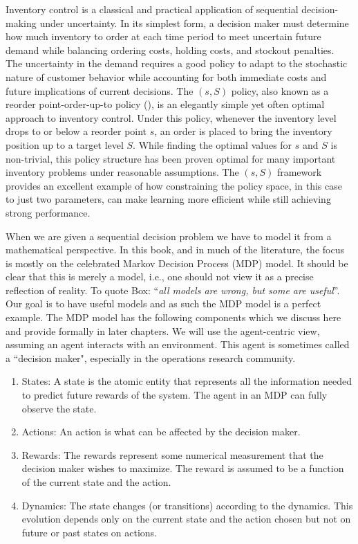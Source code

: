 \begin{example}
Inventory control is a classical and practical application of sequential decision-making under uncertainty. In its simplest form, a decision maker must determine how much inventory to order at each time period to meet uncertain future demand while balancing ordering costs, holding costs, and stockout penalties. The uncertainty in the demand requires a good policy to adapt to the stochastic nature of customer behavior while accounting for both immediate costs and future implications of current decisions.
The $(s,S)$ policy, also known as a reorder point-order-up-to policy (\cite{scarf1959optimality}), is an elegantly simple yet often optimal approach to inventory control. Under this policy, whenever the inventory level drops to or below a reorder point $s$, an order is placed to bring the inventory position up to a target level $S$. While finding the optimal values for $s$ and $S$ is non-trivial, this policy structure has been proven optimal for many important inventory problems under reasonable assumptions. The $(s,S)$ framework provides an excellent example of how constraining the policy space, in this case to just two parameters, can make learning more efficient while still achieving strong performance. \end{example}
When we are given a sequential decision problem we have to model it from a mathematical perspective. In this book, and in much of the literature, the focus is mostly on the celebrated Markov Decision Process (MDP) model. It should be clear that this is merely a model, i.e., one should not view it as a precise reflection of reality. To quote Box: ``{\it all models are wrong, but some are useful}''. Our goal is to have useful models and as such the MDP model is a perfect example. The MDP model has the following components which we discuss here and provide formally in later chapters. We will use the agent-centric view, assuming an agent interacts with an environment. This agent is sometimes called a ``decision maker", especially in the operations research community. 
\begin{enumerate}
    \item States: A state is the atomic entity that represents all the information needed to predict future rewards of the system. The agent in an MDP can fully observe the state.
    \item Actions: An action is what can be affected by the decision maker.
    \item Rewards: The rewards represent some numerical measurement that the decision maker wishes to maximize. The reward is assumed to be a function of the current state and the action.
    \item Dynamics: The state changes (or transitions) according to the dynamics. This evolution depends only on the current state and the action chosen but not on future or past states on actions.  
\end{enumerate}


